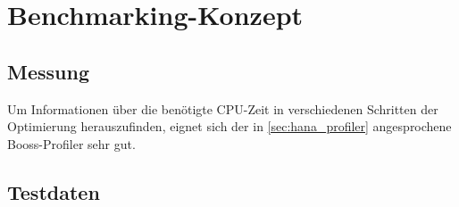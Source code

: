 \chapter{Benchmarking-Konzept}
\section{Messung}
Um Informationen über die benötigte CPU-Zeit in
verschiedenen Schritten der Optimierung herauszufinden, eignet sich der in
\autoref{sec:hana_profiler} angesprochene Booss-Profiler sehr gut.
\section{Testdaten}
